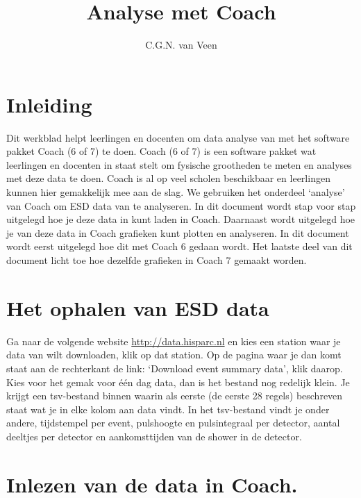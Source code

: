 

\title{Analyse met Coach}
\author{C.G.N. van Veen}



\maketitle

\section{Inleiding}

Dit werkblad helpt leerlingen en docenten om data analyse van \hisparc met
het software pakket Coach (6 of 7) te doen. Coach (6 of 7) is een software pakket wat leerlingen
en docenten in staat stelt om fysische grootheden te meten en analyses met deze
data te doen. Coach is al op veel scholen beschikbaar en leerlingen kunnen hier
gemakkelijk mee aan de slag.
We gebruiken het onderdeel `analyse' van Coach om ESD data van \hisparc te analyseren.
In dit document wordt stap voor stap uitgelegd hoe je deze data in kunt laden in
Coach. Daarnaast wordt uitgelegd hoe je van deze data in Coach
grafieken kunt plotten en analyseren. In dit document wordt eerst uitgelegd hoe
dit met Coach 6 gedaan wordt. Het laatste deel van dit document licht toe hoe dezelfde grafieken
in Coach 7 gemaakt worden.

\section{Het ophalen van ESD data}

Ga naar de volgende website \url{http://data.hisparc.nl} en kies een station waar
je data van wilt downloaden, klik op dat station. Op de pagina waar je dan komt
staat aan de rechterkant de link: `Download event summary data', klik daarop.
Kies voor het gemak voor één dag data, dan is het bestand nog redelijk klein.
Je krijgt een tsv-bestand binnen waarin als eerste (de eerste 28 regels) beschreven staat wat je
in elke kolom aan data vindt. In het tsv-bestand vindt je onder andere, tijdstempel per event,
pulshoogte en pulsintegraal per detector, aantal deeltjes per detector en aankomsttijden van
de shower in de detector.

\section{Inlezen van de data in Coach.}

